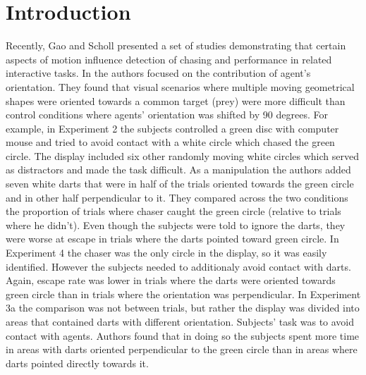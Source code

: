\documentclass{article}
\begin{document}
\section{Introduction}

Recently, Gao and Scholl presented a set of studies \citep{gao09,gao10,gao11} demonstrating that certain aspects of motion influence detection of chasing and performance in related interactive tasks. In \citet{gao10} the authors focused on the contribution of agent's orientation. They found that visual scenarios where multiple moving geometrical shapes were oriented towards a common target (prey) were more difficult than control conditions where agents' orientation was shifted by 90 degrees. For example, in Experiment 2 the subjects controlled a green disc with computer mouse and tried to avoid contact with a white circle which chased the green circle. The display included six other randomly moving white circles which served as distractors and made the task difficult. As a manipulation the authors added seven white darts that were in half of the trials oriented towards the green circle and in other half perpendicular to it. They compared across the two conditions the proportion of trials where chaser caught the green circle (relative to trials where he didn't). Even though the subjects were told to ignore the darts, they were worse at escape in trials where the darts pointed toward green circle. In Experiment 4 the chaser was the only circle in the display, so it was easily identified. However the subjects needed to additionaly avoid contact with darts. Again, escape rate was lower in trials where the darts were oriented towards green circle than in trials where the orientation was perpendicular. In Experiment 3a the comparison was not between trials, but rather the display was divided into areas that contained darts with different orientation. Subjects' task was to avoid contact with agents. Authors found that in doing so the subjects spent more time in areas with darts oriented perpendicular to the green circle than in areas where darts pointed directly towards it.\\
\end{document}

